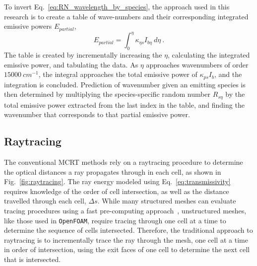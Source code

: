 To invert Eq.~\ref{eq:RN_wavelength_by_species}, the approach used in this research is to create a table of wave-numbers and their corresponding integrated emissive powers $E_{partial}$, 
\begin{equation}
    E_{partial}=\int_0^\eta{}{\kappa_{\eta{}s}I_{b\eta}~d\eta}~.
\end{equation}
The table is created by incrementally increasing the $\eta{}$, calculating the integrated emissive power, and tabulating the data. As $\eta{}$ approaches wavenumbers of order $15000~cm^{-1}$, the integral approaches the total emissive power of $\kappa{}_{ps}I_b$, and the integration is concluded. Prediction of wavenumber given an emitting species is then determined by multiplying the species-specific random number $R_{s\eta}$ by the total emissive power extracted from the last index in the table, and finding the wavenumber that corresponds to that partial emissive power.

\subsection{Raytracing}\label{section:Raytracing}
The conventional MCRT methods rely on a raytracing procedure to determine the optical distances a ray propagates through in each cell, as shown in Fig.~\ref{fig:raytracing}. 
The ray energy modeled using Eq.~\ref{eq:transmissivity} requires knowledge of the order of cell intersection, as well as the distance travelled through each cell, $\Delta{}s$. While many structured meshes can evaluate tracing procedures using a fast pre-computing approach~\cite{Amanatides1987ATracing}, unstructured meshes, like those used in \texttt{OpenFOAM}, require tracing through one cell at a time to determine the sequence of cells intersected.
Therefore, the traditional approach to raytracing is to incrementally trace the ray through the mesh, one cell at a time in order of intersection, using the exit faces of one cell to determine the next cell that is intersected. 

